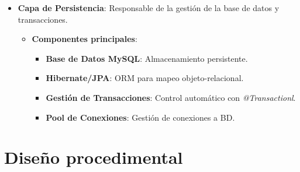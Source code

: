 \begin{itemize}
	\item \textbf{Capa de Persistencia}: Responsable de la gestión de la base de datos y transacciones.
	\begin{itemize}
       \item \textbf{Componentes principales}: 
       	\begin{itemize}
               \item \textbf{Base de Datos MySQL}: Almacenamiento persistente.
               \item \textbf{Hibernate/JPA}: ORM para mapeo objeto-relacional.
               \item \textbf{Gestión de Transacciones}: Control automático con \emph{@Transactionl}.
               \item \textbf{Pool de Conexiones}: Gestión de conexiones a BD.
            \end{itemize}
    \end{itemize}

\end{itemize}

\newpage

\section{Diseño procedimental}



